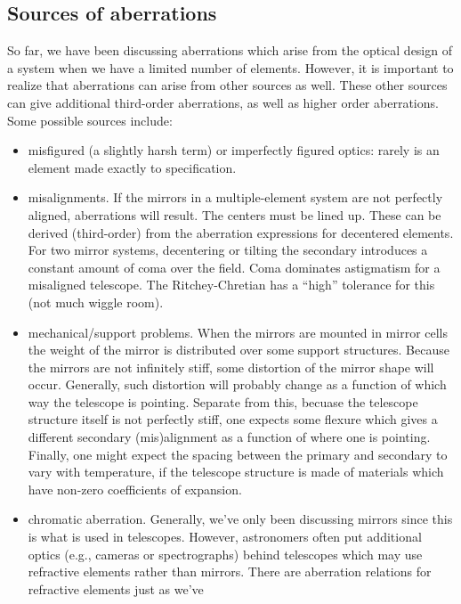 \documentclass[12pt]{article}
\begin{document}
\subsection{Sources of aberrations}
So far, we have been discussing aberrations which arise from the
optical design of a system when we have a limited number of elements.
However, it is important to realize that aberrations can arise from
other sources as well. These other sources can give additional
third-order aberrations, as well as higher order aberrations. Some
possible sources include:
\begin{itemize}
    \item misfigured (a slightly harsh term)
        or imperfectly figured optics: rarely is an element made
        exactly to specification.
    \item misalignments. If the mirrors in a multiple-element system are not
        perfectly aligned, aberrations will result. The centers must be
        lined up.  These can be derived
        (third-order) from the aberration expressions for decentered elements.
        For two mirror systems, decentering or tilting the
        secondary introduces a constant amount of coma over the field. Coma
        dominates astigmatism for a misaligned telescope.
        The Ritchey-Chretian has a ``high'' tolerance for this (not much
        wiggle room).
    \item mechanical/support problems. When the mirrors are mounted in mirror
        cells the weight of the mirror is distributed over some support
        structures. Because the mirrors are not infinitely stiff, some
        distortion of the mirror shape will occur. Generally, such distortion
        will probably change as a function of which way the telescope is
        pointing. Separate from this, becuase the telescope structure itself
        is not perfectly stiff, one expects some flexure which gives a
        different secondary (mis)alignment as a function of where one is
        pointing. Finally, one might expect the spacing between the primary
        and secondary to vary with temperature, if the telescope structure is
        made of materials which have non-zero coefficients of expansion.
    \item chromatic aberration. Generally, we've only been discussing mirrors
        since this is what is used in telescopes. However, astronomers often
        put additional optics (e.g., cameras or spectrographs) behind
        telescopes which may use refractive elements rather than mirrors.
        There are aberration relations for refractive elements just as we've

\end{itemize}
\end{document}
